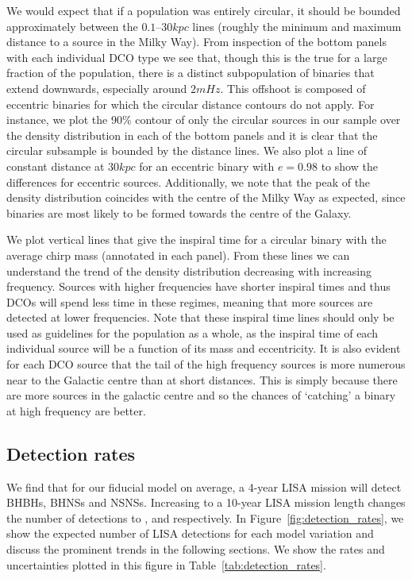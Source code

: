We would expect that if a population was entirely circular, it should be bounded approximately between the $0.1$--$30 \unit{kpc}$ lines (roughly the minimum and maximum distance to a source in the Milky Way). From inspection of the bottom panels with each individual DCO type we see that, though this is the true for a large fraction of the population, there is a distinct subpopulation of binaries that extend downwards, especially around $2 \unit{mHz}$. This offshoot is composed of eccentric binaries for which the circular distance contours do not apply. For instance, we plot the 90\% contour of only the circular sources in our sample over the density distribution in each of the bottom panels and it is clear that the circular subsample is bounded by the distance lines. We also plot a line of constant distance at $30 \unit{kpc}$ for an eccentric binary with $e = 0.98$ to show the differences for eccentric sources. Additionally, we note that the peak of the density distribution coincides with the centre of the Milky Way as expected, since binaries are most likely to be formed towards the centre of the Galaxy.

We plot vertical lines that give the inspiral time for a circular binary with the average chirp mass (annotated in each panel). From these lines we can understand the trend of the density distribution decreasing with increasing frequency. Sources with higher frequencies have shorter inspiral times and thus DCOs will spend less time in these regimes, meaning that more sources are detected at lower frequencies. Note that these inspiral time lines should only be used as guidelines for the population as a whole, as the inspiral time of each individual source will be a function of its mass and eccentricity. It is also evident for each DCO source that the tail of the high frequency sources is more numerous near to the Galactic centre than at short distances. This is simply because there are more sources in the galactic centre and so the chances of `catching' a binary at high frequency are better.

\subsection{Detection rates}\label{sec:detection_rate_analysis}
We find that for our fiducial model on average, a 4-year LISA mission will detect \BHBHFourYear{} BHBHs, \BHNSFourYear{} BHNSs and \NSNSFourYear{} NSNSs. Increasing to a 10-year LISA mission length changes the number of detections to \BHBHTenYear{}, \BHNSTenYear{} and \NSNSTenYear{} respectively. In Figure~\ref{fig:detection_rates}, we show the expected number of LISA detections for each model variation and discuss the prominent trends in the following sections. We show the rates and uncertainties plotted in this figure in Table~\ref{tab:detection_rates}.

